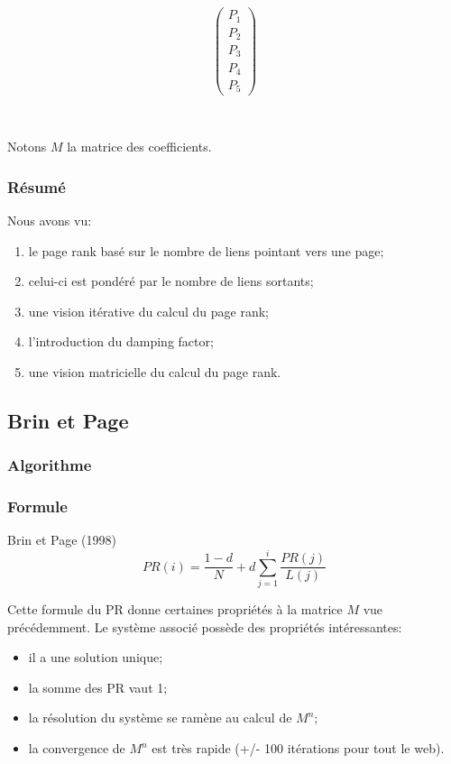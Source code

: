 \documentclass{beamer}
\begin{document}
\begin{frame}
\begin{columns}
    \begin{column}[r]{0.3\linewidth}
      \begin{minipage}{0.3\linewidth}
        \[ \left(
          \begin{array}{ c }
            P_1 \\
            P_2 \\
            P_3 \\
            P_4 \\
            P_5
          \end{array} \right)
        \]
      \end{minipage}
    \end{column}

  \end{columns}
  \ \\
  Notons $M$ la matrice des coefficients.
\end{frame}


\begin{frame}
  \frametitle{Résumé}
  
  Nous avons vu:
  
  \begin{enumerate}
  \item le page rank basé sur le nombre de liens pointant vers une
    page; 
    \pause
  \item celui-ci est pondéré par le nombre de liens sortants;
    \pause
  \item une vision itérative du calcul du page rank;
    \pause
  \item l'introduction du damping factor;
    \pause
  \item une vision matricielle du calcul du page rank.
  \end{enumerate}

\end{frame}

\subsection{Brin et Page}

\begin{frame}
  \frametitle{Algorithme}
  \frametitle{Formule}
  \begin{block}{Brin et Page (1998)}
    \[PR(i) = \frac{1 - d}{N} + d \sum_{j=1}^i {\frac{PR(j)}{L(j)}}\]
  \end{block}

  Cette formule du PR donne certaines propriétés à la matrice $M$ vue
  précédemment. Le système associé possède des propriétés
  intéressantes:\\
  \begin{itemize}
    \item il a une solution unique;
    \item la somme des PR vaut 1;
    \item la résolution du système se ramène au calcul de $M^n$;
    \item la convergence de $M^n$ est très rapide (+/- 100 itérations
      pour tout le web).
  \end{itemize}

\end{frame}
\end{document}
